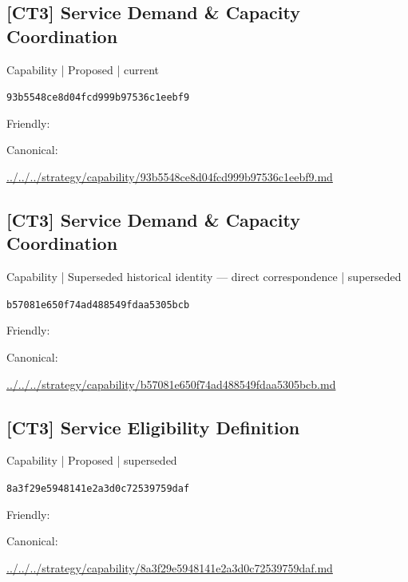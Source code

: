 \documentclass[10pt,a4paper]{article}
\begin{document}
\subsection*{[CT3] Service Demand \& Capacity Coordination}
{\small Capability | Proposed | current}\par
\texttt{93b5548ce8d04fcd999b97536c1eebf9}\par
Friendly: \par
Canonical: \par
{\footnotesize\url{../../../strategy/capability/93b5548ce8d04fcd999b97536c1eebf9.md}}\par
\subsection*{[CT3] Service Demand \& Capacity Coordination}
{\small Capability | Superseded historical identity — direct correspondence | superseded}\par
\texttt{b57081e650f74ad488549fdaa5305bcb}\par
Friendly: \par
Canonical: \par
{\footnotesize\url{../../../strategy/capability/b57081e650f74ad488549fdaa5305bcb.md}}\par
\subsection*{[CT3] Service Eligibility Definition}
{\small Capability | Proposed | superseded}\par
\texttt{8a3f29e5948141e2a3d0c72539759daf}\par
Friendly: \par
Canonical: \par
{\footnotesize\url{../../../strategy/capability/8a3f29e5948141e2a3d0c72539759daf.md}}\par
\end{document}
